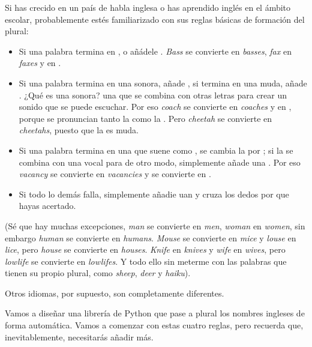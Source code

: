 Si has crecido en un país de habla inglesa o has aprendido inglés en el ámbito escolar, probablemente estés familiarizado con sus reglas básicas de formación del plural:

\begin{itemize}

\item Si una palabra termina en ,  o  añádele . \emph{Bass} se convierte en \emph{basses}, \emph{fax} en \emph{faxes} y  en .

\item Si una palabra termina en una  sonora, añade , si termina en una  muda, añade . ¿Qué es una  sonora? una que se combina con otras letras para crear un sonido que se puede escuchar. Por eso \emph{coach} se convierte en \emph{coaches} y  en , porque se pronuncian tanto la  como la . Pero \emph{cheetah} se convierte en \emph{cheetahs}, puesto que la  es muda.

\item Si una palabra termina en una  que suene como , se cambia la  por ; si la  se combina con una vocal para de otro modo, simplemente añade una . Por eso \emph{vacancy} se convierte en \emph{vacancies} y  se convierte en .

\item Si todo lo demás falla, simplemente añadie uan  y cruza los dedos por que hayas acertado.

\end{itemize}

(Sé que hay muchas excepciones, \emph{man} se convierte en \emph{men}, \emph{woman} en \emph{women}, sin embargo \emph{human} se convierte en \emph{humans}. \emph{Mouse} se convierte en \emph{mice} y \emph{louse} en \emph{lice}, pero \emph{house} se convierte en \emph{houses}. \emph{Knife} en \emph{knives} y \emph{wife} en \emph{wives}, pero \emph{lowlife} se convierte en \emph{lowlifes}. Y todo ello sin meterme con las palabras que tienen su propio plural, como \emph{sheep}, \emph{deer} y \emph{haiku}).

Otros idiomas, por supuesto, son completamente diferentes.

Vamos a diseñar una librería de Python que pase a plural los nombres ingleses de forma automática. Vamos a comenzar con estas cuatro reglas, pero recuerda que, inevitablemente, necesitarás añadir más.

